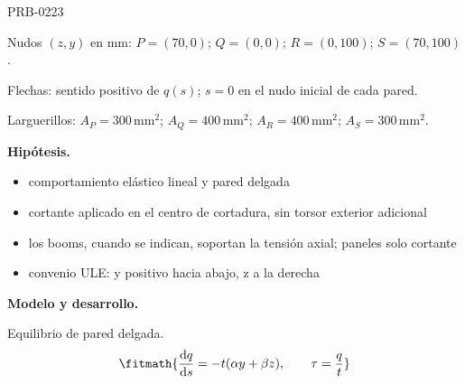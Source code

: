 \begin{studiumworked}{PRB-0223}
\par\medskip\noindent\begin{minipage}{\linewidth}\centering
{}
\par\small Nudos $(z,y)$ en mm: $P=(70,0)$; $Q=(0,0)$; $R=(0,100)$; $S=(70,100)$.
\par\small Flechas: sentido positivo de $q(s)$; $s=0$ en el nudo inicial de cada pared.
\par\small Larguerillos: $A_{P}=300\,\mathrm{mm^2}$; $A_{Q}=400\,\mathrm{mm^2}$; $A_{R}=400\,\mathrm{mm^2}$; $A_{S}=300\,\mathrm{mm^2}$.
\par\normalsize\end{minipage}\par\medskip

\textbf{Hipótesis.}\begin{itemize}\item comportamiento elástico lineal y pared delgada
\item cortante aplicado en el centro de cortadura, sin torsor exterior adicional
\item los booms, cuando se indican, soportan la tensión axial; paneles solo cortante
\item convenio ULE: y positivo hacia abajo, z a la derecha\end{itemize}

\textbf{Modelo y desarrollo.}

Equilibrio de pared delgada.\[\fitmath{\frac{\mathrm{d}q}{\mathrm{d}s}=-t(\alpha y+\beta z),\qquad \tau=\frac{q}{t}}\]


\end{studiumworked}
